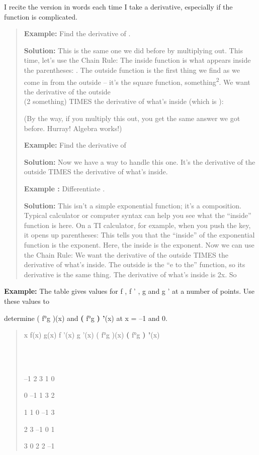 I recite the version in words each time I take a derivative, especially
if the function is complicated.

\begin{quote}
\textbf{Example:} Find the derivative of .

\textbf{Solution:} This is the same one we did before by multiplying
out. This time, let's use the Chain Rule: The inside function is what
appears inside the parentheses: . The outside function is the first
thing we find as we come in from the outside -- it's the square
function, something\textsuperscript{2}. We want the derivative of the
outside\\
(2 something) TIMES the derivative of what's inside (which is ):

(By the way, if you multiply this out, you get the same answer we got
before. Hurray! Algebra works!)

\textbf{Example:} Find the derivative of

\textbf{Solution:} Now we have a way to handle this one. It's the
derivative of the outside TIMES the derivative of what's inside.

\textbf{Example :} Differentiate .

\textbf{Solution:} This isn't a simple exponential function; it's a
composition. Typical calculator or computer syntax can help you see what
the ``inside'' function is here. On a TI calculator, for example, when
you push the key, it opens up parentheses: This tells you that the
``inside'' of the exponential function is the exponent. Here, the inside
is the exponent. Now we can use the Chain Rule: We want the derivative
of the outside TIMES the derivative of what's inside. The outside is the
``e to the'' function, so its derivative is the same thing. The
derivative of what's inside is 2x. So
\end{quote}

\textbf{Example:} The table gives values for f , f ' , g and g ' at a
number of points. Use these values to

determine ( f°g )(x) and \textbf{(} f°g \textbf{) '}(x) at x = --1 and
0.

\begin{quote}
x f(x) g(x) f '(x) g '(x) ( f°g )(x) \textbf{(} f°g \textbf{) '}(x)

~~\emph{~~~~~~~~~~~~~~~~~~~~~~~~~~~~~~~~~~~~~~~~~~~~~~~~~~~~~~~~~~~~~~~~~
~ ~}

--1 2 3 1 0

0 --1 1 3 2

1 1 0 --1 3

2 3 --1 0 1

3 0 2 2 --1
\end{quote}


